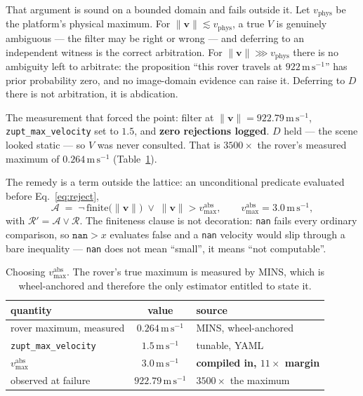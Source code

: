 That argument is sound on a bounded domain and fails outside it. Let
$v_{\text{phys}}$ be the platform's physical maximum. For
$\lVert\mathbf{v}\rVert \lesssim v_{\text{phys}}$, a true $V$ is genuinely
ambiguous --- the filter may be right or wrong --- and deferring to an
independent witness is the correct arbitration. For
$\lVert\mathbf{v}\rVert \ggg v_{\text{phys}}$ there is no ambiguity left to
arbitrate: the proposition ``this rover travels at
$922\,\mathrm{m\,s^{-1}}$'' has prior probability zero, and no image-domain
evidence can raise it. Deferring to $D$ there is not arbitration, it is
abdication.

The measurement that forced the point: filter at
$\lVert\mathbf{v}\rVert=922.79\,\mathrm{m\,s^{-1}}$,
\texttt{zupt\_max\_velocity} set to $1.5$, and \textbf{zero rejections
logged}. $D$ held --- the scene looked static --- so $V$ was never consulted.
That is $3500\times$ the rover's measured maximum of
$0.264\,\mathrm{m\,s^{-1}}$ (Table~\ref{tab:vmax}).

The remedy is a term outside the lattice: an unconditional predicate evaluated
before Eq.~\eqref{eq:reject},
%
\begin{equation}
  \mathcal{A} \;=\; \lnot\,\mathrm{finite}\bigl(\lVert\mathbf{v}\rVert\bigr)
             \;\vee\; \lVert\mathbf{v}\rVert > v_{\max}^{\mathrm{abs}},
  \qquad v_{\max}^{\mathrm{abs}} = 3.0\,\mathrm{m\,s^{-1}},
  \label{eq:absolu}
\end{equation}
%
with $\mathcal{R}' = \mathcal{A} \vee \mathcal{R}$. The finiteness clause is
not decoration: \texttt{nan} fails every ordinary comparison, so
$\texttt{nan} > x$ evaluates false and a \texttt{nan} velocity would slip
through a bare inequality --- \texttt{nan} does not mean ``small'', it means
``not computable''.

\begin{table}[htbp]
\centering
\caption{Choosing $v_{\max}^{\mathrm{abs}}$. The rover's true maximum is
measured by MINS, which is wheel-anchored and therefore the only estimator
entitled to state it.}
\label{tab:vmax}
\begin{tabular}{lcl}
\hline
quantity & value & source \\
\hline
rover maximum, measured        & $0.264\,\mathrm{m\,s^{-1}}$ & MINS, wheel-anchored \\
\texttt{zupt\_max\_velocity} & $1.5\,\mathrm{m\,s^{-1}}$   & tunable, YAML \\
$v_{\max}^{\mathrm{abs}}$     & $3.0\,\mathrm{m\,s^{-1}}$   & \textbf{compiled in, $11\times$ margin} \\
observed at failure            & $922.79\,\mathrm{m\,s^{-1}}$ & $3500\times$ the maximum \\
\hline
\end{tabular}
\end{table}

